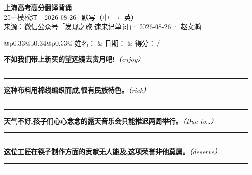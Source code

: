 \documentclass[11pt,a4paper]{article}
\newcommand{\num}[1]{\makebox[1.9em][r]{#1.}\hspace{0.3em}}
\newcommand{\wline}{\noindent\rule{\linewidth}{0.4pt}}
\newcommand{\prompt}[1]{\emph{\textcolor{tipblue}{\small（#1）}}}
\begin{document}
\pagestyle{plain}
\begin{center}
{\LARGE\bfseries 上海高考高分翻译背诵 }\\[0.25em]
{\large 25一模松江　2026-08-26 \quad\ 默写（中 $\to$ 英）}\\[0.35em]
{\footnotesize 来源：微信公众号「发现之旅 速来记单词」· 2026-08-26 · 赵文瀚}
\end{center}

\vspace{0.4em}
\noindent\begin{tabular}{@{}p{0.33\textwidth}@{}p{0.34\textwidth}@{}p{0.33\textwidth}@{}}
姓名：\underline{\hspace{2.0cm}} & 日期：\underline{\hspace{2.0cm}} & 得分：\underline{\hspace{1.4cm}}\,/ \\
\end{tabular}

\vspace{0.5em}

\vspace{0.8em}
\num{1}\textbf{不如我们带上新买的望远镜去赏月吧!}\prompt{enjoy}

\vspace{0.3em}

\wline\vspace{0.3em}
\wline

\num{2}\textbf{这种布料用棉线编织而成,很有民族特色。}\prompt{rich}

\vspace{0.3em}

\wline\vspace{0.3em}
\wline

\num{3}\textbf{天气不好,孩子们心心念念的露天音乐会只能推迟两周举行。}\prompt{Due to…}

\vspace{0.3em}

\wline\vspace{0.3em}
\wline

\num{4}\textbf{这位工匠在筷子制作方面的贡献无人能及,这项荣誉非他莫属。}\prompt{deserve}

\vspace{0.3em}

\wline\vspace{0.3em}
\wline
\end{document}
